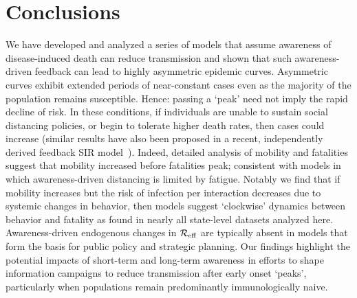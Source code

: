 \section{Conclusions}
We have developed and analyzed
a series of models that assume awareness of disease-induced death can 
reduce transmission and shown that such awareness-driven feedback
can lead
to highly asymmetric epidemic curves.  Asymmetric
curves exhibit extended periods of near-constant
cases even as the majority of the population remains susceptible.
Hence: passing a `peak' need not imply
the rapid decline of risk.  
In these conditions, if individuals are unable
to sustain social
distancing policies, or begin to tolerate higher death rates, then cases 
could increase (similar results have also been proposed in a recent, independently derived feedback SIR model~\citep{franco2020feedback}). 
Indeed, detailed analysis of mobility and fatalities suggest
that mobility increased before fatalities peak; consistent
with models in which awareness-driven distancing
is limited by fatigue.  Notably we find that
if mobility increases but the risk of infection per interaction
decreases due to systemic changes in behavior, then models
suggest `clockwise' dynamics between behavior and fatality 
as found in nearly all state-level datasets analyzed here.
Awareness-driven
endogenous changes in ${\cal{R}}_{\mathrm{eff}}$ are typically
absent in models that form the basis for public policy and strategic planning.
Our findings
highlight the potential impacts of short-term and long-term awareness 
in efforts to shape information campaigns
to reduce transmission after early onset `peaks', particularly
when populations remain predominantly immunologically naive.

